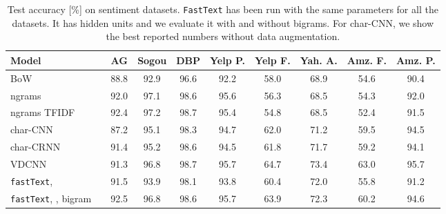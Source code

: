 \begin{table*}[t]
\centering
\small
\begin{tabular}{@{\hspace{3pt}}l@{\hspace{3pt}}ccccccccc}
\toprule
Model && AG & Sogou & DBP & Yelp P. & Yelp F. & Yah. A. & Amz. F. & Amz. P. \\
\midrule
BoW~\cite{zhang2015character}          && 88.8 & 92.9 & 96.6 & 92.2 & 58.0 & 68.9 & 54.6 & 90.4 \\
ngrams~\cite{zhang2015character}       && 92.0 & 97.1 & 98.6 & 95.6 & 56.3 & 68.5 & 54.3 & 92.0 \\
ngrams TFIDF~\cite{zhang2015character} && 92.4 & 97.2 & 98.7 & 95.4 & 54.8 & 68.5 & 52.4 & 91.5 \\
char-CNN~\cite{zhang2015text}          && 87.2 & 95.1 & 98.3 & 94.7 & 62.0 & 71.2 & 59.5 & 94.5 \\
char-CRNN~\cite{xiao2016efficient}     && 91.4 & 95.2 & 98.6 & 94.5 & 61.8 & 71.7 & 59.2 & 94.1 \\
VDCNN~\cite{conneau2016}               && 91.3 & 96.8 & 98.7 & 95.7 & 64.7 & 73.4 & 63.0 & 95.7 \\
\midrule
\texttt{fastText},              && 91.5 & 93.9 & 98.1 & 93.8 & 60.4 & 72.0 & 55.8 & 91.2 \\
\texttt{fastText}, , bigram     && 92.5 & 96.8 & 98.6 & 95.7 & 63.9 & 72.3 & 60.2 & 94.6 \\
\bottomrule
\end{tabular}
\caption{Test accuracy [\%] on sentiment datasets.
\texttt{FastText} has been run with the same parameters for all the datasets. 
It has  hidden units and we evaluate it with and without bigrams.
For char-CNN, we show the best reported numbers without data augmentation. 
}\label{tab:sent_res}
\end{table*}

